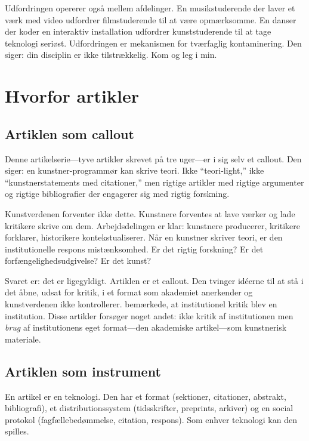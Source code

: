 \documentclass[10pt,letterpaper,twocolumn]{article}
\begin{document}
Udfordringen opererer også mellem afdelinger. En musikstuderende der laver et værk med video udfordrer filmstuderende til at være opmærksomme. En danser der koder en interaktiv installation udfordrer kunststuderende til at tage teknologi seriøst. Udfordringen er mekanismen for tværfaglig kontaminering. Den siger: din disciplin er ikke tilstrækkelig. Kom og leg i min.

\section{Hvorfor artikler}

\subsection{Artiklen som callout}

Denne artikelserie---tyve artikler skrevet på tre uger---er i sig selv et callout. Den siger: en kunstner-programmør kan skrive teori. Ikke ``teori-light,'' ikke ``kunstnerstatements med citationer,'' men rigtige artikler med rigtige argumenter og rigtige bibliografier der engagerer sig med rigtig forskning.

Kunstverdenen forventer ikke dette. Kunstnere forventes at lave værker og lade kritikere skrive om dem. Arbejdsdelingen er klar: kunstnere producerer, kritikere forklarer, historikere kontekstualiserer. Når en kunstner skriver teori, er den institutionelle respons mistænksomhed. Er det rigtig forskning? Er det forfængelighedsudgivelse? Er det kunst?

Svaret er: det er ligegyldigt. Artiklen er et callout. Den tvinger idéerne til at stå i det åbne, udsat for kritik, i et format som akademiet anerkender og kunstverdenen ikke kontrollerer. \citet{fraser2005critique} bemærkede, at institutionel kritik blev en institution. Disse artikler forsøger noget andet: ikke kritik af institutionen men \emph{brug} af institutionens eget format---den akademiske artikel---som kunstnerisk materiale.

\subsection{Artiklen som instrument}

En artikel er en teknologi. Den har et format (sektioner, citationer, abstrakt, bibliografi), et distributionssystem (tidsskrifter, preprints, arkiver) og en social protokol (fagfællebedømmelse, citation, respons). Som enhver teknologi kan den spilles.
\end{document}
